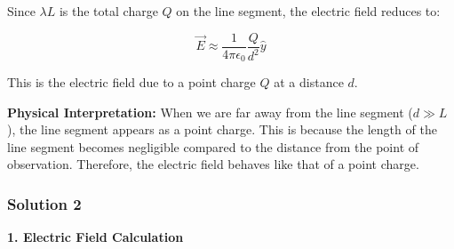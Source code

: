 \documentclass{article}
\begin{document}
\begin{enumerate}
Since \(\lambda L\) is the total charge \(Q\) on the line segment, the electric field reduces to:

\[\vec{E} \approx \frac{1}{4\pi\epsilon_0} \frac{Q}{d^2} \hat{y}\]

This is the electric field due to a point charge \(Q\) at a distance \(d\).

\textbf{Physical Interpretation:} When we are far away from the line segment (\(d \gg L\)), the line segment appears as a point charge. This is because the length of the line segment becomes negligible compared to the distance from the point of observation. Therefore, the electric field behaves like that of a point charge.
\end{enumerate}


\subsubsection{Solution 2}
\textbf{1. Electric Field Calculation}
\end{document}
